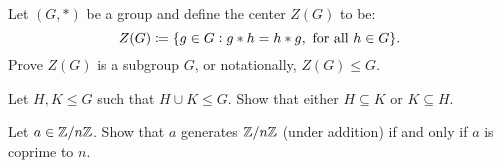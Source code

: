 \documentclass[12pt,oneside,numbers=endperiod,a4paper]{scrartcl}
\begin{document}
\begin{problem}
  Let $(G,\ast)$ be a group and define the center $Z(G)$ to be:
  \[ Z(G) \coloneq \set{g \in G : g \ast h = h \ast g, \text{ for all $h \in G$}}. \]
  Prove $Z(G)$ is a subgroup $G$, or notationally, $Z(G) \leq G$.
\end{problem}

\begin{problem}
  Let $H,K \leq G$ such that $H \cup K \leq G$. Show that either $H \subseteq K$ or $K \subseteq H$.
\end{problem}

\begin{problem}
  Let $a \in \mathbb{Z}/n\mathbb{Z}$. Show that $a$ generates $\mathbb{Z}/n\mathbb{Z}$ (under addition) if and only if $a$ is coprime to $n$.
\end{problem}
\end{document}
